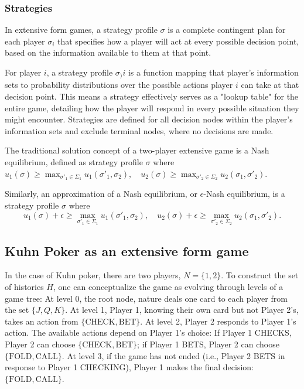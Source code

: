 \documentclass{article}
\begin{document}
\subsubsection{Strategies}
In extensive form games, a strategy profile $\sigma$ is a complete contingent plan for each player $\sigma_i$ that specifies how a player will act at every possible decision point, based on the information available to them at that point. 

For player \(i\), a strategy profile $\sigma_)i$ is a function mapping that player's information sets to probability distributions over the possible actions player $i$ can take at that decision point. This means a strategy effectively serves as a "lookup table" for the entire game, detailing how the player will respond in every possible situation they might encounter. Strategies are defined for all decision nodes within the player’s information sets and exclude terminal nodes, where no decisions are made. 

The traditional solution concept of a two-player extensive game is a Nash equilibrium, defined as strategy profile \(\sigma\) where 
$
u_1(\sigma) \geq \max_{\sigma'_1 \in \Sigma_1} u_1(\sigma'_1, \sigma_2), \quad
u_2(\sigma) \geq \max_{\sigma'_2 \in \Sigma_2} u_2(\sigma_1, \sigma'_2).
$

Similarly, an approximation of a Nash equilibrium, or \(\epsilon\)-Nash equilibrium, is a strategy profile \(\sigma\) where 
\[
u_1(\sigma) + \epsilon \geq \max_{\sigma'_1 \in \Sigma_1} u_1(\sigma'_1, \sigma_2), \quad
u_2(\sigma) + \epsilon \geq \max_{\sigma'_2 \in \Sigma_2} u_2(\sigma_1, \sigma'_2).
\]



\subsection{Kuhn Poker as an extensive form game}
In the case of Kuhn poker, there are two players, \( N = \{1, 2\} \). To construct the set of histories \( H \), one can conceptualize the game as evolving through levels of a game tree: At level 0, the root node, nature deals one card to each player from the set \( \{J, Q, K\} \). At level 1, Player 1, knowing their own card but not Player 2's, takes an action from \( \{\text{CHECK}, \text{BET}\} \). At level 2, Player 2 responds to Player 1's action. The available actions depend on Player 1's choice: If Player 1 CHECKS, Player 2 can choose \( \{\text{CHECK}, \text{BET}\} \); if Player 1 BETS, Player 2 can choose \( \{\text{FOLD}, \text{CALL}\} \). At level 3, if the game has not ended (i.e., Player 2 BETS in response to Player 1 CHECKING), Player 1 makes the final decision: \( \{\text{FOLD}, \text{CALL}\} \). \\
\end{document}
